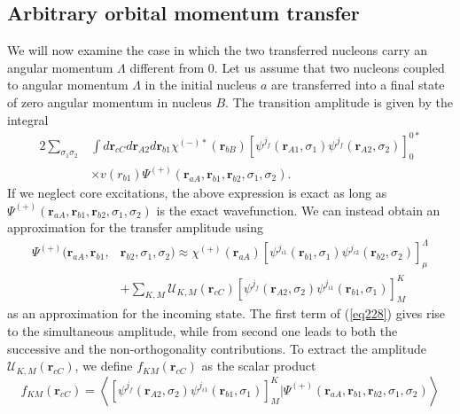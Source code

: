 \subsection{Arbitrary orbital momentum transfer}\label{C7S2S10}
We will now examine the case in which the two transferred nucleons carry an angular momentum $\Lambda$ different from 0. Let us assume that two nucleons coupled to angular momentum $\Lambda$ in the initial nucleus $a$ are transferred into a final state of zero angular momentum in nucleus $B$. The transition amplitude is given by the integral
 \begin{equation}\label{eq227}
 \begin{split}
2\sum_{\sigma_1 \sigma_2} & \int d\mathbf{r}_{cC} d\mathbf{r}_{A2}d\mathbf{r}_{b1} \chi^{(-)*}(\mathbf{r}_{bB}) \left[ \psi^{j_f} (\mathbf{r}_{A1}, \sigma_1) \psi^{j_f} (\mathbf{r}_{A2}, \sigma_2) \right] _{0}^{0*}\\
& \times v(r_{b1})\Psi^{(+)}(\mathbf{r}_{aA},\mathbf{r}_{b1},\mathbf{r}_{b2},\sigma_1,\sigma_2).
\end{split}
\end{equation}
If we neglect core excitations, the above expression is exact as long as \\\mbox{$\Psi^{(+)}(\mathbf{r}_{aA},\mathbf{r}_{b1},\mathbf{r}_{b2},\sigma_1,\sigma_2)$} is the exact wavefunction. We can instead obtain an approximation for the transfer amplitude using
  \begin{equation}\label{eq228}
 \begin{split}
\Psi^{(+)}(\mathbf{r}_{aA},\mathbf{r}_{b1},&\mathbf{r}_{b2},\sigma_1,\sigma_2)\approx \chi^{(+)}(\mathbf{r}_{aA}) \left[ \psi^{j_{i1}} (\mathbf{r}_{b1}, \sigma_1) \psi^{j_{i2}} (\mathbf{r}_{b2}, \sigma_2) \right]_{\mu}^{\Lambda}\\
 &+\sum_{K,M}\mathcal U_{K,M}(\mathbf{r}_{cC})\left[ \psi^{j_f} (\mathbf{r}_{A2}, \sigma_2) \psi^{j_{i1}} (\mathbf{r}_{b1}, \sigma_1) \right] _{M}^{K}
\end{split}
\end{equation}
as an approximation for the incoming state. The first term of (\ref{eq228}) gives rise to the simultaneous amplitude, while from second one leads to both the successive and the non-orthogonality contributions.
To extract the amplitude $\mathcal U_{K,M}(\mathbf{r}_{cC})$, we define $f_{KM}(\mathbf{r}_{cC})$ as the scalar product
\begin{equation}\label{eq229}
f_{KM}(\mathbf{r}_{cC})=\left \langle \left[ \psi^{j_f} (\mathbf{r}_{A2}, \sigma_2) \psi^{j_{i1}} (\mathbf{r}_{b1}, \sigma_1) \right] _{M}^{K} \Big | \Psi^{(+)}(\mathbf{r}_{aA},\mathbf{r}_{b1},\mathbf{r}_{b2},\sigma_1,\sigma_2) \right \rangle
\end{equation}
